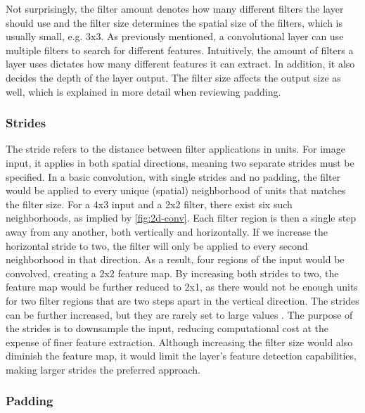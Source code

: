 Not surprisingly, the filter amount denotes how many different filters the layer should use and the filter size determines the spatial size of the filters, which is usually small, e.g. 3x3. As previously mentioned, a convolutional layer can use multiple filters to search for different features. Intuitively, the amount of filters a layer uses dictates how many different features it can extract. In addition, it also decides the depth of the layer output. The filter size affects the output size as well, which is explained in more detail when reviewing padding.

\subsubsection{Strides}

The stride refers to the distance between filter applications in units. For image input, it applies in both spatial directions, meaning two separate strides must be specified. In a basic convolution, with single strides and no padding, the filter would be applied to every unique (spatial) neighborhood of units that matches the filter size. For a 4x3 input and a 2x2 filter, there exist six such neighborhoods, as implied by \autoref{fig:2d-conv}. Each filter region is then a single step away from any another, both vertically and horizontally. If we increase the horizontal stride to two, the filter will only be applied to every second neighborhood in that direction. As a result, four regions of the input would be convolved, creating a 2x2 feature map. By increasing both strides to two, the feature map would be further reduced to 2x1, as there would not be enough units for two filter regions that are two steps apart in the vertical direction. The strides can be further increased, but they are rarely set to large values \cite{cs231n-part1}. The purpose of the strides is to downsample the input, reducing computational cost at the expense of finer feature extraction. Although increasing the filter size would also diminish the feature map, it would limit the layer's feature detection capabilities, making larger strides the preferred approach.

\subsubsection{Padding}

